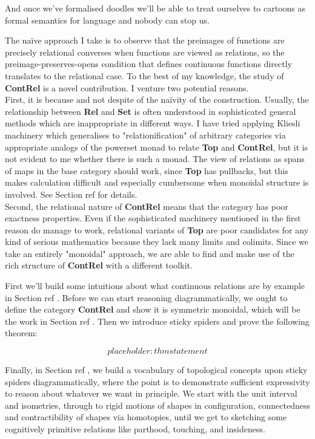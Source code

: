 And once we've formalised doodles we'll be able to treat ourselves to cartoons as formal semantics for language and nobody can stop us.


The na\"{i}ve approach I take is to observe that the preimages of functions are precisely relational converses when functions are viewed as relations, so the preimage-preserves-opens condition that defines continuous functions directly translates to the relational case. To the best of my knowledge, the study of \textbf{ContRel} is a novel contribution. I venture two potential reasons.\\

First, it is because and not despite of the na\"{i}vity of the construction. Usually, the relationship between \textbf{Rel} and \textbf{Set} is often understood in sophisticated general methods which are inappropriate in different ways. I have tried applying Kliesli machinery which generalises to "relationification" of arbitrary categories via appropriate analogs of the powerset monad to relate \textbf{Top} and \textbf{ContRel}, but it is not evident to me whether there is such a monad. The view of relations as spans of maps in the base category should work, since \textbf{Top} has pullbacks, but this makes calculation difficult and especially cumbersome when monoidal structure is involved. See Section \bR ref \e for details.\\

Second, the relational nature of \textbf{ContRel} means that the category has poor exactness properties. Even if the sophisticated machinery mentioned in the first reason do manage to work, relational variants of \textbf{Top} are poor candidates for any kind of serious mathematics because they lack many limits and colimits. Since we take an entirely "monoidal" approach, we are able to find and make use of the rich structure of \textbf{ContRel} with a different toolkit.

 First we'll build some intuitions about what continuous relations are by example in Section \bR ref \e. Before we can start reasoning diagrammatically, we ought to define the category \textbf{ContRel} and show it is symmetric monoidal, which will be the work in Section \bR ref \e. Then we introduce sticky spiders and prove the following theorem:

\begin{theorem}
\[placeholder: thm statement\]
\end{theorem}

Finally, in Section \bR ref \e, we build a vocabulary of topological concepts upon sticky spiders diagrammatically, where the point is to demonstrate sufficient expressivity to reason about whatever we want in principle. We start with the unit interval and isometries, through to rigid motions of shapes in configuration, connectedness and contractibility of shapes via homotopies, until we get to sketching some cognitively primitive relations like parthood, touching, and insideness.

\clearmargin
